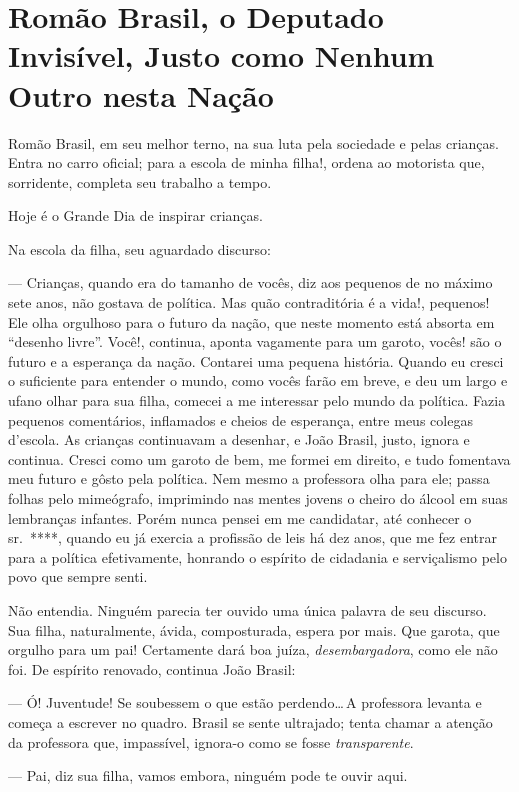 \chapter[Romão Brasil, o Deputado Invisível]{Romão Brasil, o Deputado Invisível, Justo como Nenhum Outro nesta Nação}

Romão Brasil, em seu melhor terno, na sua luta pela sociedade e pelas crianças. Entra no carro oficial; para a escola de minha filha!, ordena ao motorista que, sorridente, completa seu trabalho a tempo.

Hoje é o Grande Dia de inspirar crianças.

Na escola da filha, seu aguardado discurso:

--- Crianças, quando era do tamanho de vocês, diz aos pequenos de no máximo sete anos, não gostava de política. Mas quão contraditória é a vida!, pequenos! Ele olha orgulhoso para o futuro da nação, que neste momento está absorta em ``desenho livre''. Você!, continua, aponta vagamente para um garoto, vocês! são o futuro e a esperança da nação. Contarei uma pequena história. Quando eu cresci o suficiente para entender o mundo, como vocês farão em breve, e deu um largo e ufano olhar para sua filha, comecei a me interessar pelo mundo da política. Fazia pequenos comentários, inflamados e cheios de esperança, entre meus colegas d'escola. As crianças continuavam a desenhar, e João Brasil, justo, ignora e continua. Cresci como um garoto de bem, me formei em direito, e tudo fomentava meu futuro e gôsto pela política. Nem mesmo a professora olha para ele; passa folhas pelo mimeógrafo, imprimindo nas mentes jovens o cheiro do álcool em suas lembranças infantes. Porém nunca pensei em me candidatar, até conhecer o sr.~****, quando eu já exercia a profissão de leis há dez anos, que me fez entrar para a política efetivamente, honrando o espírito de cidadania e serviçalismo pelo povo que sempre senti.

Não entendia. Ninguém parecia ter ouvido uma única palavra de seu discurso. Sua filha, naturalmente, ávida, composturada, espera por mais. Que garota, que orgulho para um pai! Certamente dará boa juíza, \emph{desembargadora}, como ele não foi. De espírito renovado, continua João Brasil:

--- Ó! Juventude! Se soubessem o que estão perdendo\ldots\,A professora levanta e começa a escrever no quadro. Brasil se sente ultrajado; tenta chamar a atenção da professora que, impassível, ignora-o como se fosse \emph{transparente}.

--- Pai, diz sua filha, vamos embora, ninguém pode te ouvir aqui.

